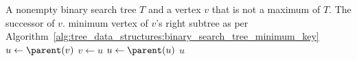 
\begin{algorithmic}[1]
\Require A nonempty binary search tree $T$ and a vertex $v$ that is not
  a maximum of $T$.
\Ensure The successor of $v$.
\If{$\rightChild[v] \neq \MyNull$}
  \State \Return minimum vertex of $v$'s right subtree as per Algorithm~\ref{alg:tree_data_structures:binary_search_tree_minimum_key}
\EndIf
\State $u \gets \parent(v)$
  \State $v \gets u$
  \State $u \gets \parent(u)$
\EndWhile
\State \Return $u$
\end{algorithmic}
